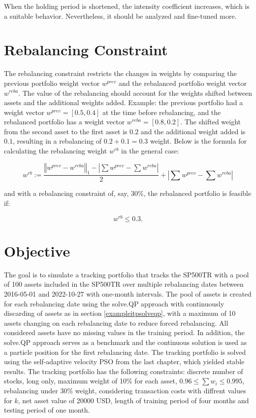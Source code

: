 \documentclass[
  oneside, a4paper, 12pt, openany]{book}
\theoremstyle{definition}
\theoremstyle{definition}
\theoremstyle{definition}
\theoremstyle{definition}
\theoremstyle{remark}
\begin{document}
When the holding period is shortened, the intensity coefficient increases, which is a suitable behavior. Nevertheless, it should be analyzed and fine-tuned more.

\hypertarget{rebalancing-constraint}{%
\section{Rebalancing Constraint}\label{rebalancing-constraint}}

The rebalancing constraint restricts the changes in weights by comparing the previous portfolio weight vector \(w^{prev}\) and the rebalanced portfolio weight vector \(w^{reba}\). The value of the rebalancing should account for the weights shifted between assets and the additional weights added. Example: the previous portfolio had a weight vector \(w^{prev} = [0.5, 0.4]\) at the time before rebalancing, and the rebalanced portfolio has a weight vector \(w^{reba} = [0.8, 0.2]\). The shifted weight from the second asset to the first asset is \(0.2\) and the additional weight added is \(0.1\), resulting in a rebalancing of \(0.2+0.1=0.3\) weight. Below is the formula for calculating the rebalancing weight \(w^{rb}\) in the general case:

\[
  w^{rb} := \frac{\left\Vert w^{prev}-w^{reba} \right\Vert_1 - |\sum w^{prev} - \sum w^{reba}|}{2}+|\sum w^{prev} - \sum w^{reba}|
\]

and with a rebalancing constraint of, say, 30\%, the rebalanced portfolio is feasible if:

\[
  w^{rb} \leq 0.3.
\]

\hypertarget{objective}{%
\section{Objective}\label{objective}}

The goal is to simulate a tracking portfolio that tracks the SP500TR with a pool of 100 assets included in the SP500TR over multiple rebalancing dates between 2016-05-01 and 2022-10-27 with one-month intervals. The pool of assets is created for each rebalancing date using the solve.QP approach with continuously discarding of assets as in section \ref{exampleitpsolveqp}, with a maximum of 10 assets changing on each rebalancing date to reduce forced rebalancing. All considered assets have no missing values in the training period. In addition, the solve.QP approach serves as a benchmark and the continuous solution is used as a particle position for the first rebalancing date. The tracking portfolio is solved using the self-adaptive velocity PSO from the last chapter, which yielded stable results. The tracking portfolio has the following constraints: discrete number of stocks, long only, maximum weight of 10\% for each asset, \(0.96 \leq \sum w_i \leq 0.995\), rebalancing under 30\% weight, considering transaction costs with diffrent values for \(k\), net asset value of 20000 USD, length of training period of four months and testing period of one month.
\end{document}
